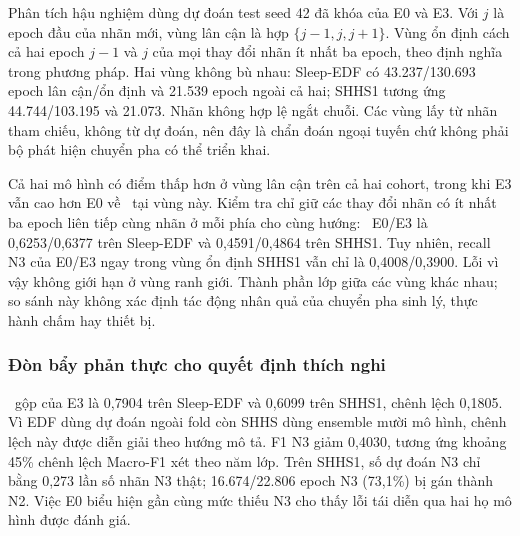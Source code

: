 Phân tích hậu nghiệm dùng dự đoán test seed 42 đã khóa của E0 và E3. Với $j$ là epoch đầu của nhãn mới, vùng lân cận là hợp $\{j-1,j,j+1\}$. Vùng ổn định cách cả hai epoch $j-1$ và $j$ của mọi thay đổi nhãn ít nhất ba epoch, theo định nghĩa trong phương pháp. Hai vùng không bù nhau: Sleep-EDF có 43.237/130.693 epoch lân cận/ổn định và 21.539 epoch ngoài cả hai; SHHS1 tương ứng 44.744/103.195 và 21.073. Nhãn không hợp lệ ngắt chuỗi. Các vùng lấy từ nhãn tham chiếu, không từ dự đoán, nên đây là chẩn đoán ngoại tuyến chứ không phải bộ phát hiện chuyển pha có thể triển khai.

\begin{table}[H]
\centering
\caption{Hiệu năng tại vùng lân cận thay đổi nhãn và vùng ổn định (seed 42)}
\label{tab:transition_stable_crosscohort}
\end{table}

Cả hai mô hình có điểm thấp hơn ở vùng lân cận trên cả hai cohort, trong khi E3 vẫn cao hơn E0 về \mf\ tại vùng này. Kiểm tra chỉ giữ các thay đổi nhãn có ít nhất ba epoch liên tiếp cùng nhãn ở mỗi phía cho cùng hướng: \mf\ E0/E3 là 0,6253/0,6377 trên Sleep-EDF và 0,4591/0,4864 trên SHHS1. Tuy nhiên, recall N3 của E0/E3 ngay trong vùng ổn định SHHS1 vẫn chỉ là 0,4008/0,3900. Lỗi vì vậy không giới hạn ở vùng ranh giới. Thành phần lớp giữa các vùng khác nhau; so sánh này không xác định tác động nhân quả của chuyển pha sinh lý, thực hành chấm hay thiết bị.

\subsubsection{Đòn bẩy phản thực cho quyết định thích nghi}

\mf\ gộp của E3 là 0,7904 trên Sleep-EDF và 0,6099 trên SHHS1, chênh lệch 0,1805. Vì EDF dùng dự đoán ngoài fold còn SHHS dùng ensemble mười mô hình, chênh lệch này được diễn giải theo hướng mô tả. F1 N3 giảm 0,4030, tương ứng khoảng 45\% chênh lệch Macro-F1 xét theo năm lớp. Trên SHHS1, số dự đoán N3 chỉ bằng 0,273 lần số nhãn N3 thật; 16.674/22.806 epoch N3 (73,1\%) bị gán thành N2. Việc E0 biểu hiện gần cùng mức thiếu N3 cho thấy lỗi tái diễn qua hai họ mô hình được đánh giá.

